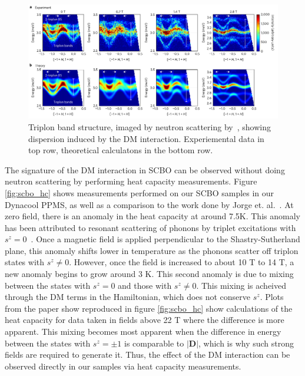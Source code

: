 \documentclass{thesis-umich}
\begin{document}
\begin{figure}
	\centering
	\caption[Triplon Bands in SCBO]{Triplon band structure, imaged by neutron scattering by~\cite{McClarty2017}, showing dispersion induced by the DM interaction. Experiemental data in top row, theoretical calculatons in the bottom row.}
	\label{fig:scbo_triplon_bands}
	\includegraphics[width=\columnwidth]{figures/SCBO_triplon_bands_McClarty.pdf}
\end{figure}

The signature of the DM interaction in SCBO can be observed without doing neutron scattering by performing heat capacity measurements. Figure \ref{fig:scbo_hc} shows measurements performed on our SCBO samples in our Dynacool PPMS, as well as a comparison to the work done by Jorge et. al.~\cite{Jorge2005}. At zero field, there is an anomaly in the heat capacity at around 7.5K. This anomaly has been attributed to resonant scattering of phonons by triplet excitations with $s^z = 0$~\cite{Hofmann2001}. Once a magnetic field is applied perpendicular to the Shastry-Sutherland plane, this anomaly shifts lower in temperature as the phonons scatter off triplon states with $s^z \neq 0$. However, once the field is increased to about 10 T to 14 T, a new anomaly begins to grow around 3 K. This second anomaly is due to mixing between the states with $s^z = 0$ and those with $s^z \neq 0$. This mixing is acheived through the DM terms in the Hamiltonian, which does not conserve $s^z$. Plots from the paper show reproduced in figure \ref{fig:scbo_hc} show calculations of the heat capacity for data taken in fields above 22 T where the difference is more apparent. This mixing becomes most apparent when the difference in energy between the states with $s^z = \pm 1$ is comparable to $|\mathbf{D}|$, which is why such strong fields are required to generate it. Thus, the effect of the DM interaction can be observed directly in our samples via heat capacity measurements.
\end{document}
